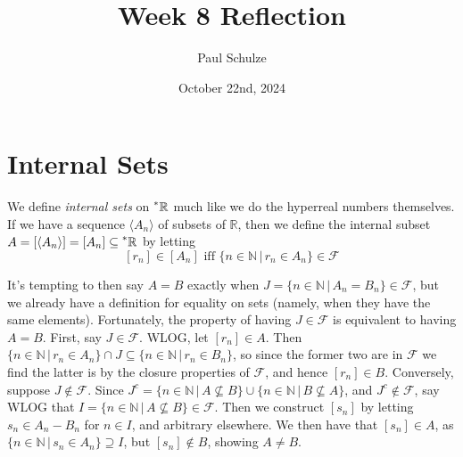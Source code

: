 \documentclass{article}
\title{Week 8 Reflection}
\author{Paul Schulze}
\date{October 22nd, 2024}
\newcommand{\sthat}{\,|\,}
\newcommand{\reals}{\mathbb{R}}
\newcommand{\hreals}{\prescript{*}{}{\mathbb{R}}}
\newcommand{\nats}{\mathbb{N}}
\begin{document}
\maketitle

\section*{Internal Sets}
We define \textit{internal sets} on $\hreals$ much like we do the hyperreal numbers themselves. If we have a sequence $\langle A_n \rangle$ of subsets of $\reals$, then we define the internal subset $A = [\langle A_n \rangle] = [A_n] \subseteq \hreals$ by letting \[[r_n] \in [A_n] \text{ iff } \{n \in \nats \,|\, r_n \in A_n\} \in \mathcal{F}\]

It's tempting to then say $A = B$ exactly when $J = \{n \in \nats \sthat A_n = B_n\} \in \mathcal{F}$, but we already have a definition for equality on sets (namely, when they have the same elements). Fortunately, the property of having $J \in \mathcal{F}$ is equivalent to having $A = B$. First, say $J \in \mathcal{F}$. WLOG, let $[r_n] \in A$. Then $\{n \in \nats \sthat r_n \in A_n\} \cap J \subseteq \{n \in \nats \sthat r_n \in B_n\}$, so since the former two are in $\mathcal{F}$ we find the latter is by the closure properties of $\mathcal{F}$, and hence $[r_n] \in B$. Conversely, suppose $J \notin \mathcal{F}$. Since $J^c = \{n \in \nats \sthat A \not\subseteq B\} \cup \{n \in \nats \sthat B \not\subseteq A\}$, and $J^c \notin \mathcal{F}$, say WLOG that $I = \{n \in \nats \sthat A \not\subseteq B\} \in \mathcal{F}$. Then we construct $[s_n]$ by letting $s_n \in A_n - B_n$ for $n \in I$, and arbitrary elsewhere. We then have that $[s_n] \in A$, as $\{n \in \nats \sthat s_n \in A_n\} \supseteq I$, but $[s_n] \notin B$, showing $A \neq B$. 
\end{document}
